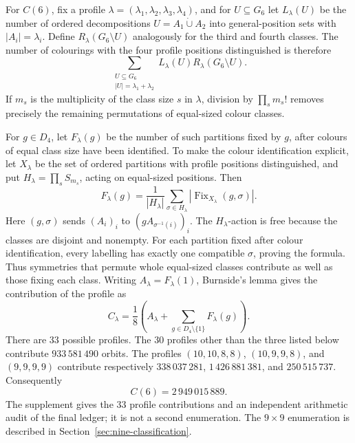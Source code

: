 \documentclass[11pt]{article}
\theoremstyle{definition}
\theoremstyle{remark}
\newcommand{\Dfour}{D_4}
\begin{document}
For \(C(6)\), fix a profile
\(\lambda=(\lambda_1,\lambda_2,\lambda_3,\lambda_4)\), and for
\(U\subseteq G_6\) let \(L_\lambda(U)\) be the number of ordered
decompositions \(U=A_1\mathbin{\dot\cup}A_2\) into general-position sets
with \(\lvert A_i\rvert=\lambda_i\).  Define \(R_\lambda(G_6\setminus U)\)
analogously for the third and fourth classes.  The number of colourings with the four
profile positions distinguished is therefore
\[
  \sum_{\substack{U\subseteq G_6\\
                   \lvert U\rvert=\lambda_1+\lambda_2}}
       L_\lambda(U)R_\lambda(G_6\setminus U).
\]
If \(m_s\) is the multiplicity of the class size \(s\) in \(\lambda\),
division by \(\prod_s m_s!\) removes precisely the remaining permutations
of equal-sized colour classes.

For \(g\in\Dfour\), let \(F_\lambda(g)\) be the number of such partitions
fixed by \(g\), after colours of equal class size have been identified.
To make the colour identification explicit, let \(X_\lambda\) be the set
of ordered partitions with profile positions distinguished, and put
\(H_\lambda=\prod_s S_{m_s}\), acting on equal-sized positions.
Then
\begin{equation}\label{eq:burnside-colour-permutations}
 F_\lambda(g)=\frac{1}{|H_\lambda|}
  \sum_{\sigma\in H_\lambda}
       |\operatorname{Fix}_{X_\lambda}(g,\sigma)|.
\end{equation}
Here \((g,\sigma)\) sends \((A_i)_i\) to
\((gA_{\sigma^{-1}(i)})_i\).  The \(H_\lambda\)-action is free because
the classes are disjoint and nonempty.  For each partition fixed after
colour identification, every labelling has exactly one compatible
\(\sigma\), proving the formula.  Thus symmetries that permute whole
equal-sized classes contribute as well as those fixing each class.
Writing \(A_\lambda=F_\lambda(1)\), Burnside's lemma gives the contribution
of the profile as
\[
  C_\lambda=\frac{1}{8}\left(
    A_\lambda+\sum_{g\in\Dfour\setminus\{1\}}F_\lambda(g)\right).
\]
There are \(33\) possible profiles.  The \(30\) profiles other than the
three listed below contribute
\(933\,581\,490\) orbits.  The profiles \((10,10,8,8)\),
\((10,9,9,8)\), and \((9,9,9,9)\) contribute respectively
\(338\,037\,281\), \(1\,426\,881\,381\), and \(250\,515\,737\).
Consequently
\[
  C(6)=2\,949\,015\,889.
\]
The supplement gives the 33 profile contributions and an independent arithmetic
audit of the final ledger; it is not a second enumeration.  The
\(9\times9\) enumeration is described in
Section~\ref{sec:nine-classification}.
\end{document}
